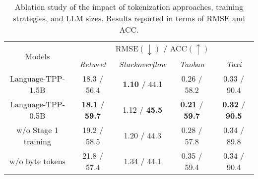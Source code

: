 \begin{table*}[!tbp]
    \centering
    \caption{Ablation study of the impact of tokenization approaches, training strategies, and LLM sizes. Results reported in terms of RMSE and ACC.} 
    \label{tab:ablation-training}
    \begin{tabular}{ccccc}
    \toprule
    \multirow{2}{*}{Models} & \multicolumn{4}{c}{RMSE$(\downarrow)$ / ACC$(\uparrow)$} \\
    \cmidrule{2-5}
    & \textit{Retweet} & \textit{Stackoverflow} & \textit{Taobao} & \textit{Taxi} \\
    \midrule
    Language-TPP-1.5B & 18.3 / 56.4 & \textbf{1.10} / 44.1 & 0.26 / 58.2 & 0.33 / 90.4 \\
    Language-TPP-0.5B & \textbf{18.1} / \textbf{59.7} & 1.12 / \textbf{45.5} & \textbf{0.21} / \textbf{59.7} & \textbf{0.32} / \textbf{90.5} \\
    w/o Stage 1 training & 19.2 / 58.5 & 1.20 / 44.3 & 0.28 / 57.8 & 0.34 / 89.8 \\
    w/o byte tokens & 21.8 / 57.4 & 1.34 / 44.1 & 0.35 / 59.4 & 0.34 / 90.4 \\
    \bottomrule
    \end{tabular}
    \end{table*}
